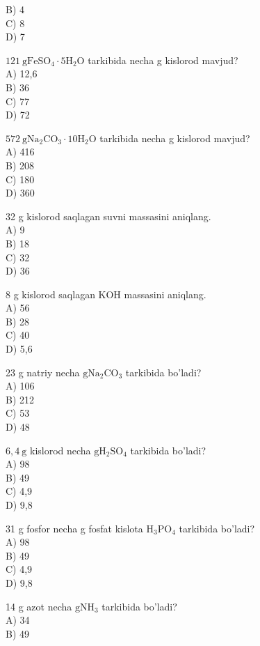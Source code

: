 B) 4\\
C) 8\\
D) 7
  \item $121 \mathrm{~g} \mathrm{FeSO}_{4} \cdot 5 \mathrm{H}_{2} \mathrm{O}$ tarkibida necha g kislorod mavjud?\\
A) 12,6\\
B) 36\\
C) 77\\
D) 72
  \item $572 \mathrm{~g} \mathrm{Na}_{2} \mathrm{CO}_{3} \cdot 10 \mathrm{H}_{2} \mathrm{O}$ tarkibida necha g kislorod mavjud?\\
A) 416\\
B) 208\\
C) 180\\
D) 360
  \item 32 g kislorod saqlagan suvni massasini aniqlang.\\
A) 9\\
B) 18\\
C) 32\\
D) 36
  \item 8 g kislorod saqlagan KOH massasini aniqlang.\\
A) 56\\
B) 28\\
C) 40\\
D) 5,6
  \item 23 g natriy necha $\mathrm{g} \mathrm{Na}_{2} \mathrm{CO}_{3}$ tarkibida bo'ladi?\\
A) 106\\
B) 212\\
C) 53\\
D) 48
  \item $6,4 \mathrm{~g}$ kislorod necha $\mathrm{g} \mathrm{H}_{2} \mathrm{SO}_{4}$ tarkibida bo'ladi?\\
A) 98\\
B) 49\\
C) 4,9\\
D) 9,8
  \item 31 g fosfor necha g fosfat kislota $\mathrm{H}_{3} \mathrm{PO}_{4}$ tarkibida bo'ladi?\\
A) 98\\
B) 49\\
C) 4,9\\
D) 9,8
  \item 14 g azot necha $\mathrm{g} \mathrm{NH}_{3}$ tarkibida bo'ladi?\\
A) 34\\
B) 49\\

